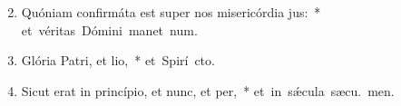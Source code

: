 \begin{flushleft}
\begin{enumerate}[leftmargin=*]
\setcounter{enumi}{1}


\item Quóniam confirmáta est super nos misericórdia jus:~* \mbox{et véritas Dómini manet  num.}
\item Glória Patri, et lio,~* \mbox{et Spirí cto.}
\item Sicut erat in princípio, et nunc, et per,~* \mbox{et in s\'{\ae}cula sæcu. men.}

\end{enumerate}
\end{flushleft}

